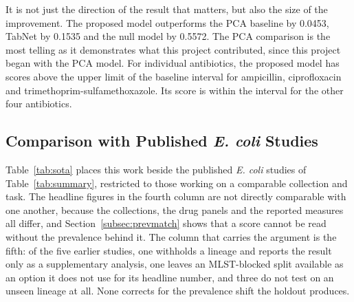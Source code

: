 \documentclass[journal]{IEEEtran}
\begin{document}
It is not just the direction of the result that matters, but also the size of the
improvement. The proposed model outperforms the PCA baseline by 0.0453, TabNet by
0.1535 and the null model by 0.5572. The PCA comparison is the most telling as it
demonstrates what this project contributed, since this project began with the PCA
model. For individual antibiotics, the proposed model has scores above the upper
limit of the baseline interval for ampicillin, ciprofloxacin and
trimethoprim-sulfamethoxazole. Its score is within the interval for the other four
antibiotics.

\subsection{Comparison with Published \textit{E. coli} Studies}
\label{subsec:sota}

Table~\ref{tab:sota} places this work beside the published \textit{E. coli} studies
of Table~\ref{tab:summary}, restricted to those working on a comparable collection
and task. The headline figures in the fourth column are not directly comparable
with one another, because the collections, the drug panels and the reported
measures all differ, and Section~\ref{subsec:prevmatch} shows that a score cannot
be read without the prevalence behind it. The column that carries the argument is
the fifth: of the five earlier studies, one withholds a lineage and reports the
result only as a supplementary analysis, one leaves an MLST-blocked split available
as an option it does not use for its headline number, and three do not test on an
unseen lineage at all. None corrects for the prevalence shift the holdout produces.
\end{document}
